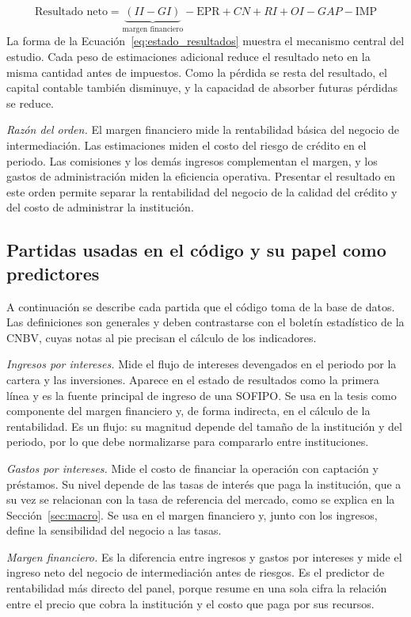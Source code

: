\begin{equation}
\text{Resultado neto} = \underbrace{(II-GI)}_{\text{margen financiero}} - \text{EPR} + CN + RI + OI - GAP - \text{IMP}
\label{eq:estado_resultados}
\end{equation}
La forma de la Ecuación~\eqref{eq:estado_resultados} muestra el mecanismo central del estudio. Cada peso de estimaciones adicional reduce el resultado neto en la misma cantidad antes de impuestos. Como la pérdida se resta del resultado, el capital contable también disminuye, y la capacidad de absorber futuras pérdidas se reduce.

\textit{Razón del orden.} El margen financiero mide la rentabilidad básica del negocio de intermediación. Las estimaciones miden el costo del riesgo de crédito en el periodo. Las comisiones y los demás ingresos complementan el margen, y los gastos de administración miden la eficiencia operativa. Presentar el resultado en este orden permite separar la rentabilidad del negocio de la calidad del crédito y del costo de administrar la institución.

\subsection{Partidas usadas en el código y su papel como predictores}
A continuación se describe cada partida que el código toma de la base de datos. Las definiciones son generales y deben contrastarse con el boletín estadístico de la CNBV, cuyas notas al pie precisan el cálculo de los indicadores.

\textit{Ingresos por intereses.} Mide el flujo de intereses devengados en el periodo por la cartera y las inversiones. Aparece en el estado de resultados como la primera línea y es la fuente principal de ingreso de una SOFIPO. Se usa en la tesis como componente del margen financiero y, de forma indirecta, en el cálculo de la rentabilidad. Es un flujo: su magnitud depende del tamaño de la institución y del periodo, por lo que debe normalizarse para compararlo entre instituciones.

\textit{Gastos por intereses.} Mide el costo de financiar la operación con captación y préstamos. Su nivel depende de las tasas de interés que paga la institución, que a su vez se relacionan con la tasa de referencia del mercado, como se explica en la Sección~\ref{sec:macro}. Se usa en el margen financiero y, junto con los ingresos, define la sensibilidad del negocio a las tasas.

\textit{Margen financiero.} Es la diferencia entre ingresos y gastos por intereses y mide el ingreso neto del negocio de intermediación antes de riesgos. Es el predictor de rentabilidad más directo del panel, porque resume en una sola cifra la relación entre el precio que cobra la institución y el costo que paga por sus recursos.

